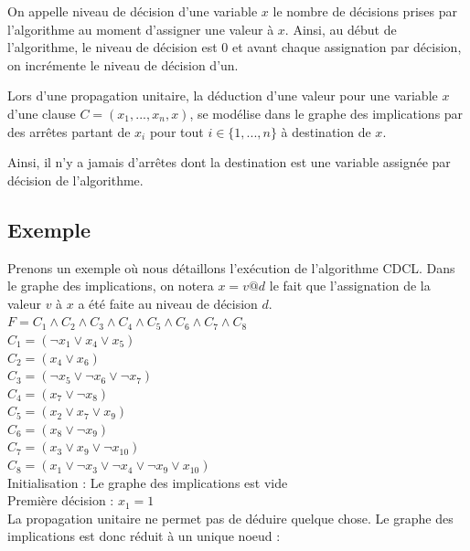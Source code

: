 \documentclass[12pt]{extarticle}
\begin{document}
On appelle niveau de décision d'une variable $x$ le nombre de décisions prises par l'algorithme au moment d'assigner une valeur à $x$. Ainsi, au début de l'algorithme, le niveau de décision est 0 et avant chaque assignation par décision, on incrémente le niveau de décision d'un.

Lors d'une propagation unitaire, la déduction d'une valeur pour une variable $x$ d'une clause $C = (x_1, ..., x_n, x)$, se modélise dans le graphe des implications par des arrêtes partant de $x_i$ pour tout $i \in \{1, ..., n\}$ à destination de $x$.

Ainsi, il n'y a jamais d'arrêtes dont la destination est une variable assignée par décision de l'algorithme.

\subsection{Exemple}

Prenons un exemple où nous détaillons l'exécution de l'algorithme CDCL. Dans le graphe des implications, on notera $x = v @ d$ le fait que l'assignation de la valeur $v$ à $x$ a été faite au niveau de décision $d$. \\

$F = C_1 \land C_2 \land C_3 \land C_4 \land C_5 \land C_6 \land C_7 \land C_8$\\
$C_1 = (\lnot{x_1} \lor x_4 \lor x_5)$ \\
$C_2 = (x_4 \lor x_6)$ \\
$C_3 = (\lnot{x_5} \lor \lnot{x_6} \lor \lnot{x_7})$ \\
$C_4 = (x_7 \lor \lnot{x_8})$ \\
$C_5 = (x_2 \lor x_7 \lor x_9)$ \\
$C_6 = (x_8 \lor \lnot{x_9})$ \\
$C_7 = (x_3 \lor x_9 \lor \lnot{x_{10}})$ \\
$C_8 = (x_1 \lor \lnot{x_3} \lor \lnot{x_4} \lor \lnot{x_9} \lor x_{10})$ \\

\noindent Initialisation : Le graphe des implications est vide  \\

\noindent Première décision : $x_1 = 1$ \\
La propagation unitaire ne permet pas de déduire quelque chose. Le graphe des implications est donc réduit à un unique noeud : \\

\end{document}
